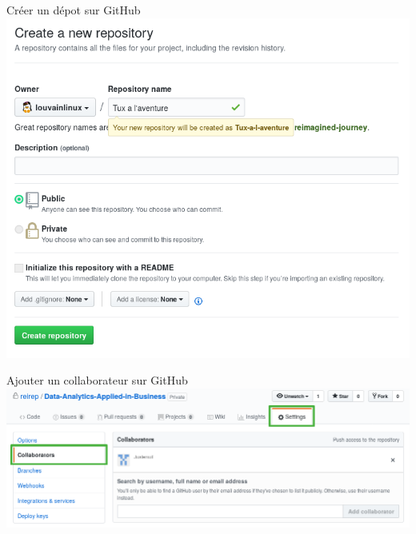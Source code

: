 \documentclass{beamer}
\begin{document}
\begin{frame}{Créer un dépot sur GitHub}
    \includegraphics[width=.9\textwidth]{img/github_desktop/new_repo.png}
\end{frame}

\begin{frame}{Ajouter un collaborateur sur GitHub}
    \includegraphics[width=\textwidth]{img/github_desktop/colaborator.png}
\end{frame}
\end{document}
